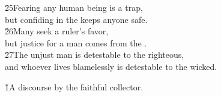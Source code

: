 \begin{poetry}
\poeml \v{25}Fearing any human being is a trap, \\
\poemll    but confiding in the  keeps anyone safe. \\
\poeml \v{26}Many seek a ruler's favor, \\
\poemll    but justice for a man comes from the . \\
\poeml \v{27}The unjust man is detestable to the righteous, \\
\poemll    and whoever lives blamelessly is detestable to the wicked.
\end{poetry}

\v{1}A discourse by the faithful collector.


